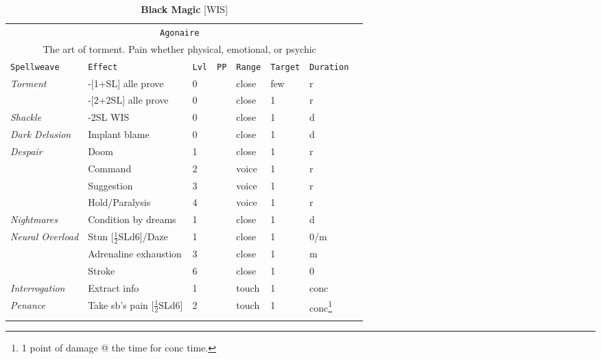 \documentclass[10pt,a4paper]{article}
\begin{document}
\newpage
\begin{table}[htbp!]
\caption*{\textbf{\Large{Black Magic}} [WIS]}
\begin{tabular}{llllllll}
	\multicolumn{7}{c}{\texttt{Agonaire}}\\
	\multicolumn{7}{c}{The art of torment. Pain whether physical, emotional, or psychic}\\
	\hline 
	\texttt{Spellweave} & \texttt{Effect} & \texttt{Lvl} & \texttt{PP} & \texttt{Range} & \texttt{Target} & \texttt{Duration} \\
    \hline
    \multirow{1}{*}{\textit{Torment}} & -[1+SL] alle prove & 0 && close & few & r \\
    							 & -[2+2SL] alle prove & 0 && close & 1 & r \\
    \hline
    \multirow{1}{*}{\textit{Shackle}} & -2SL WIS & 0 && close & 1 & d \\
    \hline
    \multirow{1}{*}{\textit{Dark Delusion}} & Implant blame & 0 && close & 1 & d \\									
    \hline
    \multirow{1}{*}{\textit{Despair}} & Doom & 1 && close & 1 & r \\	
    									& Command & 2 && voice & 1 & r \\	
    									& Suggestion & 3 && voice & 1 & r \\	
    									& Hold/Paralysis & 4 && voice & 1 & r \\									
    \hline
    \multirow{1}{*}{\textit{Nightmares}} & Condition by dreams & 1 && close & 1 & d \\
    \hline
    \multirow{1}{*}{\textit{Neural Overload}} & Stun [$\frac{1}{2}$SLd6]/Daze  & 1 && close & 1 & 0/m \\
    											& Adrenaline exhaustion & 3 && close & 1 & m \\
    											& Stroke & 6 && close & 1 & 0 \\
    \hline
    \multirow{1}{*}{\textit{Interrogation}} & Extract info & 1 && touch & 1 & conc \\
    \hline
    \multirow{1}{*}{\textit{Penance}} & Take sb's pain [$\frac{1}{2}$SLd6] & 2 && touch & 1 & conc\footnote{1 point of damage @ the time for conc time.} \\
    &&&&&&\\


\end{tabular}
\end{table}
\end{document}
